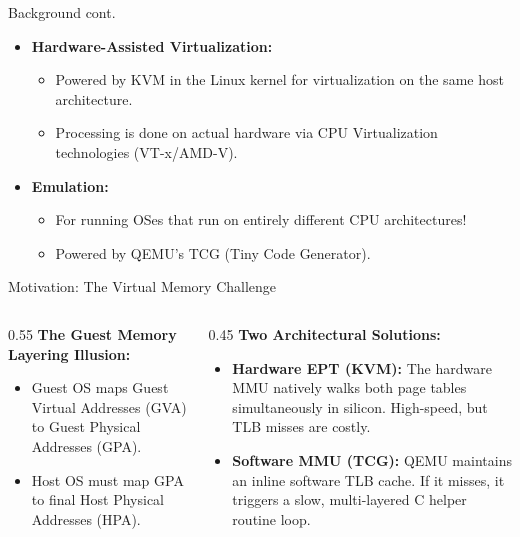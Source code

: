 \documentclass[aspectratio=169]{beamer} %
\begin{document}
  \begin{frame}{Background cont.}
      \begin{itemize}
          \item \textbf{Hardware-Assisted Virtualization:}
          \begin{itemize}
              \item Powered by KVM in the Linux kernel for virtualization on the same host architecture.
              \item Processing is done on actual hardware via CPU Virtualization technologies (VT-x/AMD-V).
          \end{itemize}
          \item \textbf{Emulation:} 
          \begin{itemize}
            \item For running OSes that run on entirely different CPU architectures!
            \item Powered by QEMU's TCG (Tiny Code Generator). 
          \end{itemize}
      \end{itemize}
  \end{frame}
  \begin{frame}{Motivation: The Virtual Memory Challenge}
      \begin{columns}[T]
          \begin{column}{0.55\textwidth}
              \textbf{The Guest Memory Layering Illusion:}
              \begin{itemize}
                  \item Guest OS maps Guest Virtual Addresses (GVA) to Guest Physical Addresses (GPA).
                  \item Host OS must map GPA to final Host Physical Addresses (HPA).
              \end{itemize}
          \end{column}
          
          \begin{column}{0.45\textwidth}
              \textbf{Two Architectural Solutions:}
              \begin{itemize}
                  \item \textbf{Hardware EPT (KVM):} The hardware MMU natively walks both page tables simultaneously in silicon. High-speed, but TLB misses are costly.
                  \item \textbf{Software MMU (TCG):} QEMU maintains an inline software TLB cache. If it misses, it triggers a slow, multi-layered C helper routine loop.
              \end{itemize}
          \end{column}
      \end{columns}
  \end{frame}
\end{document}
